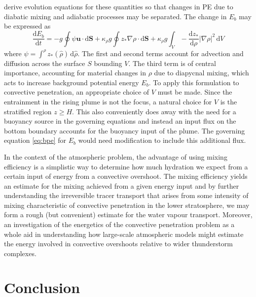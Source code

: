 \documentclass[a4paper]{article}
\begin{document}
\citet{winters1995} derive evolution equations for these quantities so that changes in PE due to diabatic
mixing and adiabatic processes may be separated. The change in $E_b$ may be expressed as
\begin{equation}
	\frac{\mathrm{d} E_b}{\mathrm{d}t} = -g\oint \psi \bm{u}\cdot \mathrm{d}\bm{S} + \kappa_\rho g \oint z_*
	\nabla \rho \cdot \mathrm{d}\bm{S} + \kappa_\rho g \int_V -\frac{\mathrm{d}z_*}{\mathrm{d}\rho} \left|
	\nabla \rho \right|^2 \,\mathrm{d}V \label{eq:bpe}
\end{equation}
where $\psi = \int^\rho z_*(\hat{\rho}) \, \mathrm{d}\hat{\rho}$. The first and second terms account for
advection and diffusion across the surface $S$ bounding $V$. The third term is of central importance,
accounting for material changes in $\rho$ due to diapycnal mixing, which acts to increase background potential
energy $E_b$. To apply this formulation to convective penetration, an appropriate choice of $V$ must be made.
Since the entrainment in the rising plume is not the focus, a natural choice for $V$ is the stratified region
$z \geq H$. This also conveniently does away with the need for a buoyancy source in the governing equations
and instead an input flux on the bottom boundary accounts for the buoyancy input of the plume. The governing
equation \eqref{eq:bpe} for $E_b$ would need modification to include this additional flux.

In the context of the atmospheric problem, the advantage of using mixing efficiency is a simplistic way to
determine how much hydration we expect from a certain input of energy from a convective overshoot. The mixing
efficiency yields an estimate for the mixing achieved from a given energy input and by further understanding
the irreversible tracer transport that arises from some intensity of mixing characteristic of convective
penetration in the lower stratosphere, we may form a rough (but convenient) estimate for the water vapour
transport. Moreover, an investigation of the energetics of the convective penetration problem as a whole aid
in understanding how large-scale atmospheric models might estimate the energy involved in convective
overshoots relative to wider thunderstorm complexes.

\section{Conclusion}
	
\end{document}
